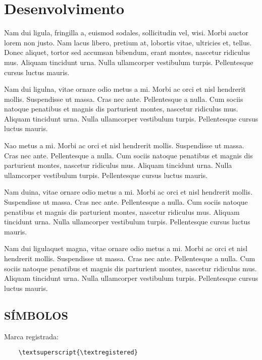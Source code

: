 \chapter{Desenvolvimento}

Nam dui ligula, fringilla a, euismod sodales, sollicitudin vel, wisi. Morbi auctor lorem non justo. Nam lacus libero, pretium at, lobortis vitae, ultricies et, tellus. Donec aliquet, tortor sed accumsan bibendum, erant montes, nascetur ridiculus mus. Aliquam tincidunt urna. Nulla ullamcorper vestibulum turpis. Pellentesque cursus luctus mauris. \cite{LUCKMANN2008}

Nam dui ligulna, vitae ornare odio metus a mi. Morbi ac orci et nisl hendrerit mollis. Suspendisse ut massa. Cras nec ante. Pellentesque a nulla. Cum sociis natoque penatibus et magnis dis parturient montes, nascetur ridiculus mus. Aliquam tincidunt urna. Nulla ullamcorper vestibulum turpis. Pellentesque cursus luctus mauris. \cite{Telles1984}

Nao metus a mi. Morbi ac orci et nisl hendrerit mollis. Suspendisse ut massa. Cras nec ante. Pellentesque a nulla. Cum sociis natoque penatibus et magnis dis parturient montes, nascetur ridiculus mus. Aliquam tincidunt urna. Nulla ullamcorper vestibulum turpis. Pellentesque cursus luctus mauris. \cite{abntex2-wiki-como-customizar}

Nam duina, vitae ornare odio metus a mi. Morbi ac orci et nisl hendrerit mollis. Suspendisse ut massa. Cras nec ante. Pellentesque a nulla. Cum sociis natoque penatibus et magnis dis parturient montes, nascetur ridiculus mus. Aliquam tincidunt urna. Nulla ullamcorper vestibulum turpis. Pellentesque cursus luctus mauris. \cite{abntex2modelo}

Nam dui ligulaquet magna, vitae ornare odio metus a mi. Morbi ac orci et nisl hendrerit mollis. Suspendisse ut massa. Cras nec ante. Pellentesque a nulla. Cum sociis natoque penatibus et magnis dis parturient montes, nascetur ridiculus mus\textsuperscript{\textregistered}. Aliquam tincidunt urna. Nulla ullamcorper vestibulum turpis. Pellentesque cursus luctus mauris. \cite{memoir}

\section{SÍMBOLOS}
Marca registrada\textsuperscript{\textregistered}:
	\begin{verbatim}
	\textsuperscript{\textregistered}
	\end{verbatim}

